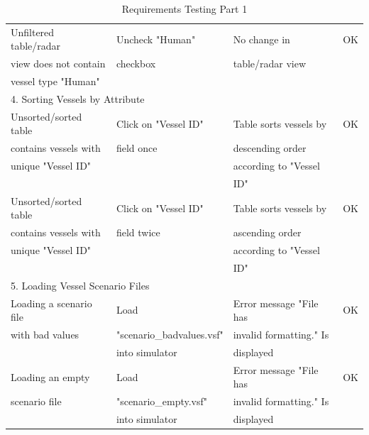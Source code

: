 \documentclass[12pt]{article}
\begin{document}
\begin{table}[ht]
\begin{tabular}{|l|l|l|l|}
        \hline
        Unfiltered table/radar  & Uncheck "Human"  & No change in   & OK\\
       view does not contain  & checkbox & table/radar view &\\
       vessel type "Human" &  &  &\\
       \hline
        \multicolumn{4}{|l|}{4. Sorting Vessels by Attribute} \\
        \hline
       Unsorted/sorted table  & Click on "Vessel ID"  & Table sorts vessels by & OK\\
       contains vessels with   &  field once & descending order   &\\
       unique "Vessel ID" &  & according to "Vessel  &\\
        & & ID"&\\
        \hline
        Unsorted/sorted table & Click on "Vessel ID" & Table sorts vessels by & OK\\
        contains vessels with & field twice & ascending order   &\\
       unique "Vessel ID"&  & according to "Vessel &\\
        & & ID"&\\
       \hline
        \multicolumn{4}{|l|}{5. Loading Vessel Scenario Files} \\
        \hline
       Loading a scenario file & Load  & Error message "File has  & OK\\
       with bad values & "scenario\_badvalues.vsf" & invalid formatting." Is &\\
        & into simulator & displayed &\\
        \hline
        Loading an empty & Load & Error message "File has & OK\\
        scenario file & "scenario\_empty.vsf" & invalid formatting." Is &\\
         & into simulator & displayed&\\
         \hline
    \end{tabular}
\caption{Requirements Testing Part 1}
\label{tab:Requirements Testing Part 1}
\end{table}



\clearpage
\end{document}
